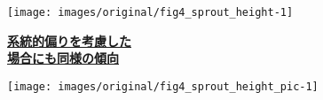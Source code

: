 \documentclass[a0, 30pt, plainboxedsections]{sciposter} %
\begin{document}
\begin{multicols}{2}
\begin{mdframed}[style=subsection.frame,frametitle=\textbf{\huge{\ding{194}}\LARGE{萌芽性が強い種ほど自己被陰率が下がる}}]
\end{mdframed}

\columnbreak
\begin{mdframed}[style=subsection.frame,frametitle=\textbf{\huge{\ding{193}}\LARGE{萌芽性が強くなるほど樹高が低くなる}}]

\begin{figure}
	\centering
		\texttt{[image: images/original/fig4\_sprout\_height-1]}
\end{figure}

\begin{figure}
 \begin{minipage}{0.3\hsize}
{\large \faHandLeft \textbf{\underline{系統的偏りを考慮した}}\\ \textbf{\underline{場合にも同様の傾向}}}
 \end{minipage}
 \begin{minipage}{0.7\hsize}
  \centering
   \texttt{[image: images/original/fig4\_sprout\_height\_pic-1]}
 \end{minipage}
\end{figure}


\end{mdframed}

\end{multicols}

\end{document}

